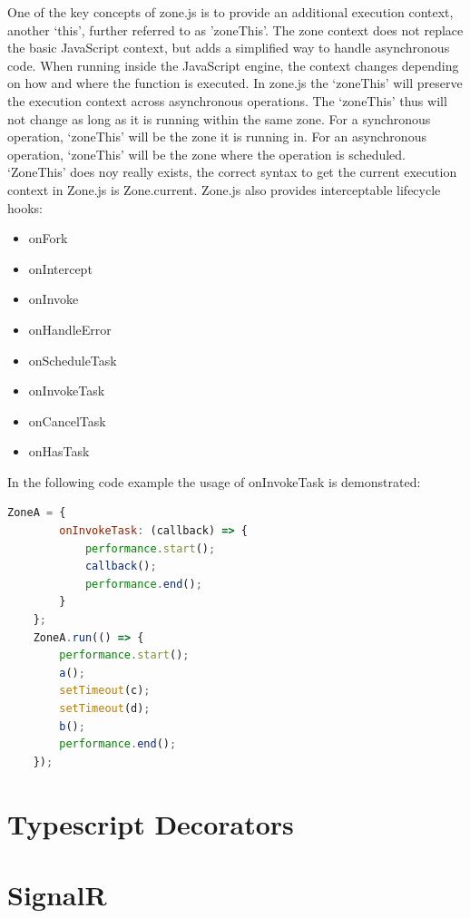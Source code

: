 One of the key concepts of zone.js is to provide an additional execution context, another ‘this’, further referred to as 'zoneThis'. The zone context does not replace the basic JavaScript context, but adds a simplified way to handle asynchronous code. When running inside the JavaScript engine, the context changes depending on how and where the function is executed. In zone.js the ‘zoneThis’ will preserve the execution context across asynchronous operations. The ‘zoneThis’ thus will not change as long as it is running within the same zone. For a synchronous operation, ‘zoneThis’ will be the zone it is running in. For an asynchronous operation, ‘zoneThis’ will be the zone where the operation is scheduled. ‘ZoneThis’ does noy really exists, the correct syntax to get the current execution context in Zone.js is Zone.current.
Zone.js also provides interceptable lifecycle hooks:
\begin{itemize}
	\item onFork
	\item onIntercept
	\item onInvoke
	\item onHandleError
	\item onScheduleTask
	\item onInvokeTask
	\item onCancelTask
	\item onHasTask
\end{itemize}

In the following code example the usage of onInvokeTask is demonstrated:
\begin{lstlisting}[language=Javascript]
	ZoneA = {
		onInvokeTask: (callback) => {
			performance.start();
			callback();
			performance.end();
		}	
	};
	ZoneA.run(() => {
		performance.start();
		a();
		setTimeout(c);
		setTimeout(d);
		b();
		performance.end();
	});
\end{lstlisting}

\section{Typescript Decorators}

\section{SignalR}
